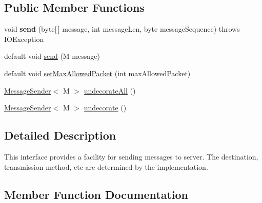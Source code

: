 \subsection*{Public Member Functions}
\begin{DoxyCompactItemize}
\item 
\mbox{\label{interfacecom_1_1mysql_1_1cj_1_1protocol_1_1_message_sender_a0c7192449eae4aa0f0dbbc9778dac002}} 
void {\bfseries send} (byte\mbox{[}$\,$\mbox{]} message, int message\+Len, byte message\+Sequence)  throws I\+O\+Exception
\item 
default void \mbox{\hyperlink{interfacecom_1_1mysql_1_1cj_1_1protocol_1_1_message_sender_a98dcb1def5601d40046a1cf5f9b67db4}{send}} (M message)
\item 
default void \mbox{\hyperlink{interfacecom_1_1mysql_1_1cj_1_1protocol_1_1_message_sender_a31345b7817dcc7e982bb96dba97b3a01}{set\+Max\+Allowed\+Packet}} (int max\+Allowed\+Packet)
\item 
\mbox{\hyperlink{interfacecom_1_1mysql_1_1cj_1_1protocol_1_1_message_sender}{Message\+Sender}}$<$ M $>$ \mbox{\hyperlink{interfacecom_1_1mysql_1_1cj_1_1protocol_1_1_message_sender_a8066931f03c2fa9cc705716fa10a4517}{undecorate\+All}} ()
\item 
\mbox{\hyperlink{interfacecom_1_1mysql_1_1cj_1_1protocol_1_1_message_sender}{Message\+Sender}}$<$ M $>$ \mbox{\hyperlink{interfacecom_1_1mysql_1_1cj_1_1protocol_1_1_message_sender_a3a352bf35ad98dc6cea7c1f4ac9480da}{undecorate}} ()
\end{DoxyCompactItemize}


\subsection{Detailed Description}
This interface provides a facility for sending messages to server. The destination, transmission method, etc are determined by the implementation. 

\subsection{Member Function Documentation}
\mbox{\label{interfacecom_1_1mysql_1_1cj_1_1protocol_1_1_message_sender_a98dcb1def5601d40046a1cf5f9b67db4}} 

